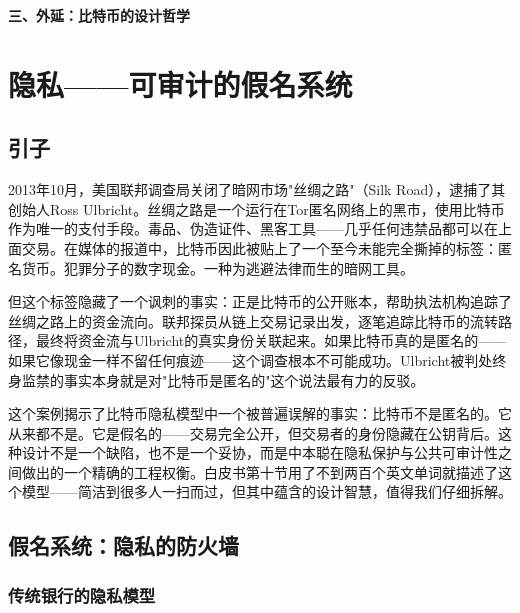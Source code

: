 \documentclass[a4paper,12pt,openany]{ctexbook}
\begin{document}
\vspace{2em}
\begin{center}
{\Large\bfseries 三、外延：比特币的设计哲学}
\end{center}
\vspace{1em}



\chapter{隐私——可审计的假名系统}



\section*{引子}


2013年10月，美国联邦调查局关闭了暗网市场"丝绸之路"（Silk Road），逮捕了其创始人Ross Ulbricht。丝绸之路是一个运行在Tor匿名网络上的黑市，使用比特币作为唯一的支付手段。毒品、伪造证件、黑客工具——几乎任何违禁品都可以在上面交易。在媒体的报道中，比特币因此被贴上了一个至今未能完全撕掉的标签：匿名货币。犯罪分子的数字现金。一种为逃避法律而生的暗网工具。

但这个标签隐藏了一个讽刺的事实：正是比特币的公开账本，帮助执法机构追踪了丝绸之路上的资金流向。联邦探员从链上交易记录出发，逐笔追踪比特币的流转路径，最终将资金流与Ulbricht的真实身份关联起来。如果比特币真的是匿名的——如果它像现金一样不留任何痕迹——这个调查根本不可能成功。Ulbricht被判处终身监禁的事实本身就是对"比特币是匿名的"这个说法最有力的反驳。

这个案例揭示了比特币隐私模型中一个被普遍误解的事实：比特币不是匿名的。它从来都不是。它是假名的——交易完全公开，但交易者的身份隐藏在公钥背后。这种设计不是一个缺陷，也不是一个妥协，而是中本聪在隐私保护与公共可审计性之间做出的一个精确的工程权衡。白皮书第十节用了不到两百个英文单词就描述了这个模型——简洁到很多人一扫而过，但其中蕴含的设计智慧，值得我们仔细拆解。


\section*{假名系统：隐私的防火墙}



\subsection*{传统银行的隐私模型}
\end{document}
